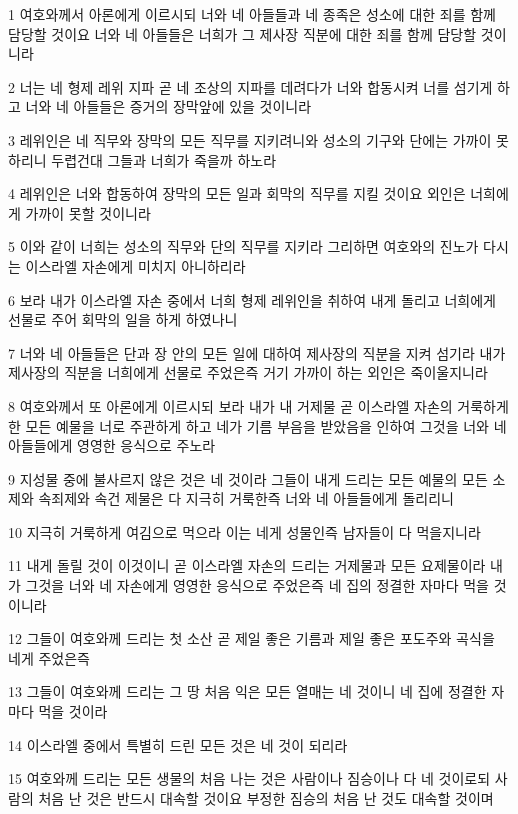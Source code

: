 \par 1 여호와께서 아론에게 이르시되 너와 네 아들들과 네 종족은 성소에 대한 죄를 함께 담당할 것이요 너와 네 아들들은 너희가 그 제사장 직분에 대한 죄를 함께 담당할 것이니라
\par 2 너는 네 형제 레위 지파 곧 네 조상의 지파를 데려다가 너와 합동시켜 너를 섬기게 하고 너와 네 아들들은 증거의 장막앞에 있을 것이니라
\par 3 레위인은 네 직무와 장막의 모든 직무를 지키려니와 성소의 기구와 단에는 가까이 못하리니 두렵건대 그들과 너희가 죽을까 하노라
\par 4 레위인은 너와 합동하여 장막의 모든 일과 회막의 직무를 지킬 것이요 외인은 너희에게 가까이 못할 것이니라
\par 5 이와 같이 너희는 성소의 직무와 단의 직무를 지키라 그리하면 여호와의 진노가 다시는 이스라엘 자손에게 미치지 아니하리라
\par 6 보라 내가 이스라엘 자손 중에서 너희 형제 레위인을 취하여 내게 돌리고 너희에게 선물로 주어 회막의 일을 하게 하였나니
\par 7 너와 네 아들들은 단과 장 안의 모든 일에 대하여 제사장의 직분을 지켜 섬기라 내가 제사장의 직분을 너희에게 선물로 주었은즉 거기 가까이 하는 외인은 죽이울지니라
\par 8 여호와께서 또 아론에게 이르시되 보라 내가 내 거제물 곧 이스라엘 자손의 거룩하게 한 모든 예물을 너로 주관하게 하고 네가 기름 부음을 받았음을 인하여 그것을 너와 네 아들들에게 영영한 응식으로 주노라
\par 9 지성물 중에 불사르지 않은 것은 네 것이라 그들이 내게 드리는 모든 예물의 모든 소제와 속죄제와 속건 제물은 다 지극히 거룩한즉 너와 네 아들들에게 돌리리니
\par 10 지극히 거룩하게 여김으로 먹으라 이는 네게 성물인즉 남자들이 다 먹을지니라
\par 11 내게 돌릴 것이 이것이니 곧 이스라엘 자손의 드리는 거제물과 모든 요제물이라 내가 그것을 너와 네 자손에게 영영한 응식으로 주었은즉 네 집의 정결한 자마다 먹을 것이니라
\par 12 그들이 여호와께 드리는 첫 소산 곧 제일 좋은 기름과 제일 좋은 포도주와 곡식을 네게 주었은즉
\par 13 그들이 여호와께 드리는 그 땅 처음 익은 모든 열매는 네 것이니 네 집에 정결한 자마다 먹을 것이라
\par 14 이스라엘 중에서 특별히 드린 모든 것은 네 것이 되리라
\par 15 여호와께 드리는 모든 생물의 처음 나는 것은 사람이나 짐승이나 다 네 것이로되 사람의 처음 난 것은 반드시 대속할 것이요 부정한 짐승의 처음 난 것도 대속할 것이며
